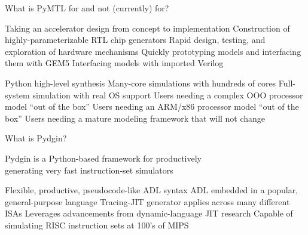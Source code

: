 \begin{frame}{What is PyMTL for and not (currently) for?}
\begin{cbxlist}

  \1 

     \2 Taking an accelerator design from concept to implementation
     \2 Construction of highly-parameterizable RTL chip generators
     \2 Rapid design, testing, and exploration of hardware mechanisms
     \2 Quickly prototyping models and interfacing them with GEM5
     \2 Interfacing models with imported Verilog

  \1 

     \2 Python high-level synthesis
     \2 Many-core simulations with hundreds of cores
     \2 Full-system simulation with real OS support
     \2 Users needing a complex OOO processor model ``out of the box''
     \2 Users needing an ARM/x86 processor model ``out of the box''
     \2 Users needing a mature modeling framework that will not change

\end{cbxlist}
\end{frame}

\begin{frame}{What is Pydgin?}

  \begin{center}
    Pydgin is a Python-based framework for productively \\ generating
    very fast instruction-set simulators
  \end{center}


  \medskip\centering
  \begin{cbxlist}[t]

    \1 Flexible, productive, pseudocode-like ADL syntax
    \1 ADL embedded in a popular, general-purpose language
    \1 Tracing-JIT generator applies across many different ISAs
    \1 Leverages advancements from dynamic-language JIT research
    \1 Capable of simulating RISC instruction sets at 100's of MIPS

  \end{cbxlist}

\end{frame}

